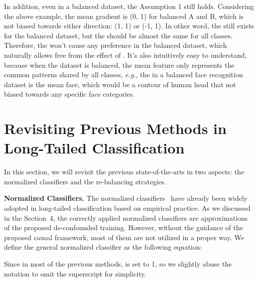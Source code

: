 \documentclass{article}
\newcommand{\eg}{\textit{e.g.}}
\begin{document}
In addition, even in a balanced dataset, the Assumption 1 still holds. Considering the above example, the mean gradient is (0, 1) for balanced A and B, which is not biased towards either direction: (1, 1) or (-1, 1). In other word, the  still exists for the balanced dataset, but the  should be almost the same for all classes. Therefore, the  won't cause any preference in the balanced dataset, which naturally allows  free from the effect of . It's also intuitively easy to understand, because when the dataset is balanced, the mean feature only represents the common patterns shared by all classes, \eg, the  in a balanced face recognition dataset is the mean face, which would be a contour of human head that not biased towards any specific face categories. 


\section{Revisiting Previous Methods in Long-Tailed Classification}
In this section, we will revisit the previous state-of-the-arts in two aspects: the normalized classifiers and the re-balancing strategies. 

\textbf{Normalized Classifiers.} The normalized classifiers~\cite{gidaris2018dynamic, qi2018low, kang2019decoupling, liu2019large} have already been widely adopted in long-tailed classification based on empirical practice. As we discussed in the Section~4, the correctly applied normalized classifiers are approximations of the proposed de-confounded training. However, without the guidance of the proposed causal framework, most of them are not utilized in a proper way.  We define the general normalized classifier as the following equation:

Since in most of the previous methods,  is set to 1, so we slightly abuse the notation to omit the superscript  for simplicity.
\end{document}
